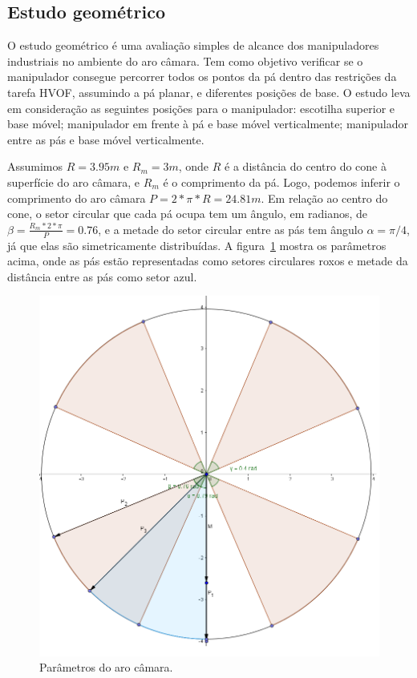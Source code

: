 \subsection{Estudo geométrico}\label{sec::estudo_geom}
O estudo geométrico é uma avaliação simples de alcance dos manipuladores
industriais no ambiente do aro câmara. Tem como objetivo verificar se o
manipulador consegue percorrer todos os pontos da pá dentro das restrições da
tarefa HVOF, assumindo a pá planar, e diferentes posições de base. O estudo
leva em consideração as seguintes posições para o manipulador: escotilha
superior e base móvel; manipulador em frente à pá e base móvel verticalmente;
manipulador entre as pás e base móvel verticalmente.

Assumimos $R = 3.95 m$ e $R_m = 3 m$, onde $R$ é a distância do centro do cone à
superfície do aro câmara, e $R_m$ é o comprimento da pá. Logo, podemos
inferir o comprimento do aro câmara $P = 2*\pi *R = 24.81 m$. Em relação ao
centro do cone, o setor circular que cada pá ocupa tem um ângulo, em radianos,
de $\beta = \frac{R_m*2*\pi}{P} = 0.76$, e a metade do setor circular entre
as pás tem ângulo $\alpha = \pi/4$, já que elas são simetricamente distribuídas.
A figura~\ref{pa} mostra os parâmetros acima, onde as pás estão representadas
como setores circulares roxos e metade da distância entre as pás como setor
azul.

\begin{figure}[h!]
\centering
	\includegraphics[width=\columnwidth]{figs/estudo/geometrico/pa.png} 
	\caption{Parâmetros do aro câmara.}
	\label{pa}
\end{figure}

